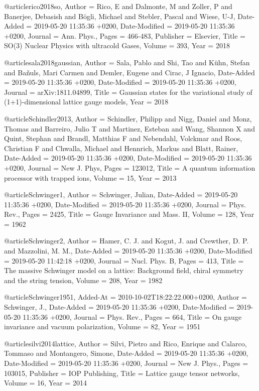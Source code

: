 \documentclass[epj,final]{svjour}
\begin{document}
@article{rico2018so,
	Author = {Rico, E and Dalmonte, M and Zoller, P and Banerjee, Debasish and B{\"o}gli, Michael and Stebler, Pascal and Wiese, U-J},
	Date-Added = {2019-05-20 11:35:36 +0200},
	Date-Modified = {2019-05-20 11:35:36 +0200},
	Journal = {Ann. Phys.},
	Pages = {466-483},
	Publisher = {Elsevier},
	Title = {{SO(3)} {Nuclear Physics} with ultracold Gases},
	Volume = {393},
	Year = {2018}}

@article{sala2018gaussian,
	Author = {Sala, Pablo and Shi, Tao and K{\"u}hn, Stefan and Ba{\~n}uls, Mari Carmen and Demler, Eugene and Cirac, J Ignacio},
	Date-Added = {2019-05-20 11:35:36 +0200},
	Date-Modified = {2019-05-20 11:35:36 +0200},
	Journal = {arXiv:1811.04899},
	Title = {Gaussian states for the variational study of (1+1)-dimensional lattice gauge models},
	Year = {2018}}

@article{Schindler2013,
	Author = {Schindler, Philipp and Nigg, Daniel and Monz, Thomas and Barreiro, Julio T and Martinez, Esteban and Wang, Shannon X and Quint, Stephan and Brandl, Matthias F and Nebendahl, Volckmar and Roos, Christian F and Chwalla, Michael and Hennrich, Markus and Blatt, Rainer},
	Date-Added = {2019-05-20 11:35:36 +0200},
	Date-Modified = {2019-05-20 11:35:36 +0200},
	Journal = {New J. Phys},
	Pages = {123012},
	Title = {{A quantum information processor with trapped ions}},
	Volume = {15},
	Year = {2013}}

@article{Schwinger1,
	Author = {Schwinger, Julian},
	Date-Added = {2019-05-20 11:35:36 +0200},
	Date-Modified = {2019-05-20 11:35:36 +0200},
	Journal = {Phys. Rev.},
	Pages = {2425},
	Title = {{Gauge Invariance and Mass. II}},
	Volume = {128},
	Year = {1962}}

@article{Schwinger2,
	Author = {Hamer, C. J. and Kogut, J. and Crewther, D. P. and Mazzolini, M. M.},
	Date-Added = {2019-05-20 11:35:36 +0200},
	Date-Modified = {2019-05-20 11:42:18 +0200},
	Journal = {Nucl. Phys. B},
	Pages = {413},
	Title = {The massive Schwinger model on a lattice: Background field, chiral symmetry and the string tension},
	Volume = {208},
	Year = {1982}}

@article{Schwinger1951,
	Added-At = {2010-10-02T18:22:22.000+0200},
	Author = {Schwinger, J.},
	Date-Added = {2019-05-20 11:35:36 +0200},
	Date-Modified = {2019-05-20 11:35:36 +0200},
	Journal = {Phys. Rev.},
	Pages = {664},
	Title = {{On gauge invariance and vacuum polarization}},
	Volume = 82,
	Year = 1951}

@article{silvi2014lattice,
	Author = {Silvi, Pietro and Rico, Enrique and Calarco, Tommaso and Montangero, Simone},
	Date-Added = {2019-05-20 11:35:36 +0200},
	Date-Modified = {2019-05-20 11:35:36 +0200},
	Journal = {New J. Phys.},
	Pages = {103015},
	Publisher = {IOP Publishing},
	Title = {Lattice gauge tensor networks},
	Volume = {16},
	Year = {2014}}
\end{document}
